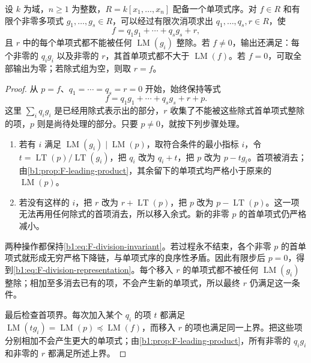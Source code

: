 \begin{theorem}[多元除法]\label{b1:thm:F-division}
	设 \(k\) 为域，\(n\geq1\) 为整数，\(R=k[x_1,\ldots,x_n]\) 配备一个单项式序。对 \(f\in R\) 和有限个非零多项式 \(g_1,\ldots,g_s\in R\)，可以经过有限次消项求出 \(q_1,\ldots,q_s,r\in R\)，使
	\begin{equation}\label{b1:eq:F-division-representation}
		f=q_1g_1+\cdots+q_sg_s+r,
	\end{equation}
	且 \(r\) 中的每个单项式都不能被任何 \(\operatorname{LM}(g_i)\) 整除。若 \(f\ne0\)，输出还满足：每个非零的 \(q_i g_i\) 以及非零的 \(r\)，其首单项式都不大于 \(\operatorname{LM}(f)\)。若 \(f=0\)，可取全部输出为零；若除式组为空，则取 \(r=f\)。
\end{theorem}
\begin{proof}
	从 \(p=f\)、\(q_1=\cdots=q_s=r=0\) 开始，始终保持等式
	\begin{equation}\label{b1:eq:F-division-invariant}
		f=q_1g_1+\cdots+q_sg_s+r+p.
	\end{equation}
	这里 \(\sum_iq_i g_i\) 是已经用除式表示出的部分，\(r\) 收集了不能被这些除式首单项式整除的项，\(p\) 则是尚待处理的部分。只要 \(p\ne0\)，就按下列步骤处理。
	\begin{enumerate}
		\item 若有 \(i\) 满足 \(\operatorname{LM}(g_i)\mid\operatorname{LM}(p)\)，取符合条件的最小指标 \(i\)，令 \(t=\operatorname{LT}(p)/\operatorname{LT}(g_i)\)，把 \(q_i\) 改为 \(q_i+t\)，把 \(p\) 改为 \(p-tg_i\)。首项被消去；由\cref{b1:prop:F-leading-product}，其余留下的单项式均严格小于原来的 \(\operatorname{LM}(p)\)。
		\item 若没有这样的 \(i\)，把 \(r\) 改为 \(r+\operatorname{LT}(p)\)，把 \(p\) 改为 \(p-\operatorname{LT}(p)\)。这一项无法再用任何除式的首项消去，所以移入余式。新的非零 \(p\) 的首单项式仍严格减小。
	\end{enumerate}
	两种操作都保持\eqref{b1:eq:F-division-invariant}。若过程永不结束，各个非零 \(p\) 的首单项式就形成无穷严格下降链，与单项式序的良序性矛盾。因此有限步后 \(p=0\)，得到\eqref{b1:eq:F-division-representation}。每个移入 \(r\) 的单项式都不被任何 \(\operatorname{LM}(g_i)\) 整除；相加至多消去已有的项，不会产生新的单项式，所以最终 \(r\) 仍满足这一条件。

	最后检查首项界。每次加入某个 \(q_i\) 的项 \(t\) 都满足 \(\operatorname{LM}(tg_i)=\operatorname{LM}(p)\preceq\operatorname{LM}(f)\)，而移入 \(r\) 的项也满足同一上界。把这些项分别相加不会产生更大的单项式；由\cref{b1:prop:F-leading-product}，所有非零的 \(q_i g_i\) 和非零的 \(r\) 都满足所述上界。
\end{proof}

